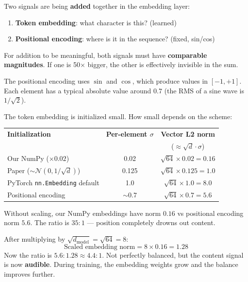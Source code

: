 \documentclass[11pt, a4paper]{article}
\begin{document}
\begin{intuition}
Two signals are being \textbf{added} together in the embedding layer:

\begin{enumerate}
\item \textbf{Token embedding}: what character is this? (learned)
\item \textbf{Positional encoding}: where is it in the sequence? (fixed, sin/cos)
\end{enumerate}

For addition to be meaningful, both signals must have \textbf{comparable magnitudes}.
If one is 50$\times$ bigger, the other is effectively invisible in the sum.

\medskip
\noindent The positional encoding uses $\sin$ and $\cos$, which produce values in $[-1, +1]$.
Each element has a typical absolute value around $0.7$ (the RMS of a sine wave is $1/\sqrt{2}$).

\noindent The token embedding is initialized small. How small depends on the scheme:

\begin{center}
\begin{tabular}{lcc}
\toprule
\textbf{Initialization} & \textbf{Per-element $\sigma$} & \textbf{Vector L2 norm} \\
& & ($\approx \sqrt{d} \cdot \sigma$) \\
\midrule
Our NumPy ($\times 0.02$) & 0.02 & $\sqrt{64} \times 0.02 = 0.16$ \\
Paper ($ \sim \mathcal{N}(0, 1/\sqrt{d})$) & 0.125 & $\sqrt{64} \times 0.125 = 1.0$ \\
PyTorch \texttt{nn.Embedding} default & 1.0 & $\sqrt{64} \times 1.0 = 8.0$ \\
Positional encoding & $\sim 0.7$ & $\sqrt{64} \times 0.7 = 5.6$ \\
\bottomrule
\end{tabular}
\end{center}

\medskip
\noindent Without scaling, our NumPy embeddings have norm $0.16$ vs positional encoding norm $5.6$.
The ratio is $35:1$ --- position completely drowns out content.

\medskip
\noindent After multiplying by $\sqrt{d_\text{model}} = \sqrt{64} = 8$:
\[
\text{Scaled embedding norm} = 8 \times 0.16 = 1.28
\]
Now the ratio is $5.6 : 1.28 \approx 4.4 : 1$. Not perfectly balanced, but the content signal
is now \textbf{audible}. During training, the embedding weights grow and the balance improves further.
\end{intuition}
\end{document}
